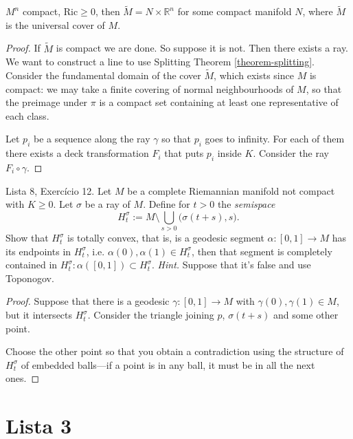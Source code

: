 \begin{exercise}
\label{exercise-product-of-compact-and-Rn}
$M^n$ compact, $\text{Ric} \geq 0$, then
$\tilde{M}=N \times \mathbb{R}^n$ for
some compact manifold $N$, where  $\tilde{M}$
is
the universal cover of $M$.
\end{exercise}

\begin{proof}
If $\tilde{M}$ is compact we are done.
So suppose it is not.
Then there exists a
ray. We want to construct
a line to use Splitting Theorem
\ref{theorem-splitting}.
Consider the fundamental domain of the cover
$\tilde{M}$,
which exists since
$M$ is compact: we may take a finite covering
of normal neighbourhoods of $M$,
so that the preimage under $\pi$ is a compact
set containing at least one
representative of each class.

Let $p_i$ be a sequence along the ray
$\gamma$
so that $p_i$ goes to infinity.
For each of them there exists a
deck transformation $F_i$ that puts $p_i$
inside
$K$. Consider the ray $F_i \circ \gamma$.
\end{proof}

\begin{exercise}
\label{exercise-rays-semispaces}
Lista 8, Exercício 12. Let $M$ be a complete
Riemannian manifold not compact
with $K \geq 0$. Let $\sigma$ be a ray of
$M$. Define for $t>0$ the {\it
semispace}
$$
H_t^{\sigma}:=M\setminus
\bigcup_{s>0}\Big(\sigma(t+s),s).
$$
Show that $H_t^{\sigma}$ is totally convex,
that is, is a geodesic segment
 $\alpha:[0,1]\to M$ has its endpoints in
 $H_t^{\sigma}$, i.e.
$\alpha(0),\alpha(1) \in H_t^{\sigma}$, then
that segment is completely
contained in $H_t^{\sigma}:\alpha([0,1])
\subset H_t^{\sigma}$. {\it Hint.}
Suppose that it's false and use Toponogov.
\end{exercise}

\begin{proof}
Suppose that there is a geodesic
$\gamma:[0,1]\to M$ with $\gamma(0),\gamma(1)
\in M$, but it intersects $H_t^{\sigma}$.
Consider the triangle joining $p$,
$\sigma(t+s)$ and some other point.

Choose the other point so that you obtain a
contradiction using the structure of
$H_t^{\sigma}$ of embedded balls---if a point
is in any ball, it must be in all
the next ones.
\end{proof}

\section{Lista 3}
\label{section-lista-3}

